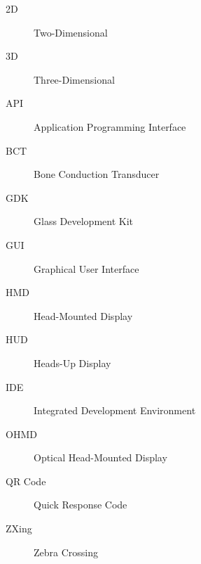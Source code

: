 \begin{description}
	\item [2D] Two-Dimensional
	\item [3D] Three-Dimensional
	\item [API] Application Programming Interface
	\item [BCT] Bone Conduction Transducer
	\item [GDK] Glass Development Kit
	\item [GUI] Graphical User Interface
	\item [HMD] Head-Mounted Display
	\item [HUD] Heads-Up Display
	\item [IDE] Integrated Development Environment
	\item [OHMD] Optical Head-Mounted Display
	\item [QR Code] Quick Response Code
	\item [ZXing] Zebra Crossing
\end{description}